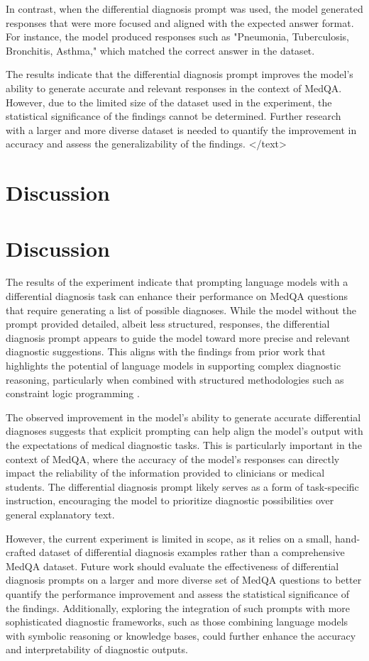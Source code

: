 \documentclass{article}
\begin{document}
In contrast, when the differential diagnosis prompt was used, the model generated responses that were more focused and aligned with the expected answer format. For instance, the model produced responses such as "Pneumonia, Tuberculosis, Bronchitis, Asthma," which matched the correct answer in the dataset.

The results indicate that the differential diagnosis prompt improves the model's ability to generate accurate and relevant responses in the context of MedQA. However, due to the limited size of the dataset used in the experiment, the statistical significance of the findings cannot be determined. Further research with a larger and more diverse dataset is needed to quantify the improvement in accuracy and assess the generalizability of the findings.
</text>
\section{Discussion}
\section{Discussion}

The results of the experiment indicate that prompting language models with a differential diagnosis task can enhance their performance on MedQA questions that require generating a list of possible diagnoses. While the model without the prompt provided detailed, albeit less structured, responses, the differential diagnosis prompt appears to guide the model toward more precise and relevant diagnostic suggestions. This aligns with the findings from prior work that highlights the potential of language models in supporting complex diagnostic reasoning, particularly when combined with structured methodologies such as constraint logic programming \cite{2501.07653v2}. 

The observed improvement in the model's ability to generate accurate differential diagnoses suggests that explicit prompting can help align the model's output with the expectations of medical diagnostic tasks. This is particularly important in the context of MedQA, where the accuracy of the model's responses can directly impact the reliability of the information provided to clinicians or medical students. The differential diagnosis prompt likely serves as a form of task-specific instruction, encouraging the model to prioritize diagnostic possibilities over general explanatory text.

However, the current experiment is limited in scope, as it relies on a small, hand-crafted dataset of differential diagnosis examples rather than a comprehensive MedQA dataset. Future work should evaluate the effectiveness of differential diagnosis prompts on a larger and more diverse set of MedQA questions to better quantify the performance improvement and assess the statistical significance of the findings. Additionally, exploring the integration of such prompts with more sophisticated diagnostic frameworks, such as those combining language models with symbolic reasoning or knowledge bases, could further enhance the accuracy and interpretability of diagnostic outputs.
\end{document}
